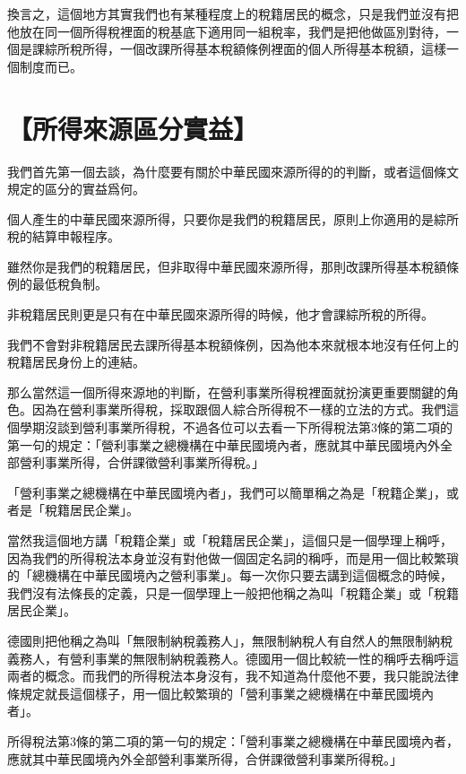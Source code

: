 \documentclass[]{ctexbook}
\begin{document}
換言之，這個地方其實我們也有某種程度上的稅籍居民的概念，只是我們並沒有把他放在同一個所得稅裡面的稅基底下適用同一組稅率，我們是把他做區別對待，一個是課綜所稅所得，一個改課所得基本稅額條例裡面的個人所得基本稅額，這樣一個制度而已。

\hypertarget{ux6240ux5f97ux4f86ux6e90ux5340ux5206ux5be6ux76ca}{%
\section{【所得來源區分實益】}\label{ux6240ux5f97ux4f86ux6e90ux5340ux5206ux5be6ux76ca}}

我們首先第一個去談，為什麼要有關於中華民國來源所得的的判斷，或者這個條文規定的區分的實益爲何。

個人產生的中華民國來源所得，只要你是我們的稅籍居民，原則上你適用的是綜所稅的結算申報程序。

雖然你是我們的稅籍居民，但非取得中華民國來源所得，那則改課所得基本稅額條例的最低稅負制。

非稅籍居民則更是只有在中華民國來源所得的時候，他才會課綜所稅的所得。

我們不會對非稅籍居民去課所得基本稅額條例，因為他本來就根本地沒有任何上的稅籍居民身份上的連結。

那么當然這一個所得來源地的判斷，在營利事業所得稅裡面就扮演更重要關鍵的角色。因為在營利事業所得稅，採取跟個人綜合所得稅不一樣的立法的方式。我們這個學期沒談到營利事業所得稅，不過各位可以去看一下所得稅法第3條的第二項的第一句的規定：「營利事業之總機構在中華民國境內者，應就其中華民國境內外全部營利事業所得，合併課徵營利事業所得稅。」

「營利事業之總機構在中華民國境內者」，我們可以簡單稱之為是「稅籍企業」，或者是「稅籍居民企業」。

當然我這個地方講「稅籍企業」或「稅籍居民企業」，這個只是一個學理上稱呼，因為我們的所得稅法本身並沒有對他做一個固定名詞的稱呼，而是用一個比較繁瑣的「總機構在中華民國境內之營利事業」。每一次你只要去講到這個概念的時候，我們沒有法條長的定義，只是一個學理上一般把他稱之為叫「稅籍企業」或「稅籍居民企業」。

德國則把他稱之為叫「無限制納稅義務人」，無限制納稅人有自然人的無限制納稅義務人，有營利事業的無限制納稅義務人。德國用一個比較統一性的稱呼去稱呼這兩者的概念。而我們的所得稅法本身沒有，我不知道為什麼他不要，我只能說法律條規定就長這個樣子，用一個比較繁瑣的「營利事業之總機構在中華民國境內者」。

所得稅法第3條的第二項的第一句的規定：「營利事業之總機構在中華民國境內者，應就其中華民國境內外全部營利事業所得，合併課徵營利事業所得稅。」
\end{document}
